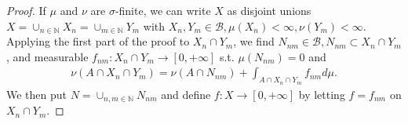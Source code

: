 \begin{proof}
    If \(\mu\) and \(\nu\) are \(\sigma\)-finite, we can write \(X\) as disjoint unions \(X=\cup_{n\in\mathbb{N}}X_n=\cup_{m\in\mathbb{N}} Y_m\)
    with \(X_n, Y_m\in \mathscr{B}, \mu(X_n)<\infty, \nu(Y_m)<\infty\). Applying the first part of the proof to \(X_n\cap Y_m\), we find
    \(N_{nm}\in\mathscr{B}, N_{nm}\subset X_n\cap Y_m\), and measurable \(f_{nm}:X_n\cap Y_m\rightarrow [0,+\infty]\) s.t. 
    \(\mu(N_{nm}) = 0 \) and 
    \begin{align*}
        \nu\left(A\cap X_n\cap Y_m\right) = \nu\left(A\cap N_{nm}\right) + \int_{A\cap X_n\cap Y_m} f_{nm}d\mu.
    \end{align*}
    We then put \(N=\cup_{n,m\in\mathbb{N}} N_{nm}\) and define \(f:X\rightarrow[0,+\infty]\) by letting \(f=f_{nm}\) on \(X_n\cap Y_m\).
\end{proof}
\fi 

